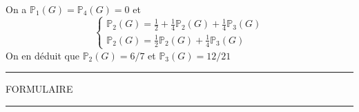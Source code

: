 \documentclass[11pt, addpoints, answers]{exam}
\begin{document}
\begin{questions}
\begin{solution}
On a $\mathbb{P}_1(G) = \mathbb{P}_4(G)=0$ et 
$$
\begin{cases}
\mathbb{P}_2(G) = \frac{1}{2}+\frac{1}{4}\mathbb{P}_2(G)+\frac{1}{4}\mathbb{P}_3(G)\\
\mathbb{P}_2(G) = \frac{1}{2}\mathbb{P}_2(G)+\frac{1}{4}\mathbb{P}_3(G)
\end{cases}
$$
On en déduit que $\mathbb{P}_2(G) = 6/7$ et $\mathbb{P}_3(G) = 12/21$  
\end{solution}
\end{questions}
\newpage
\hrule
\vspace*{.15in}
\begin{center}
  \large\MakeUppercase{Formulaire}
\end{center}
\vspace*{.15in}
\hrule
\vspace*{.25in}
\end{document}
